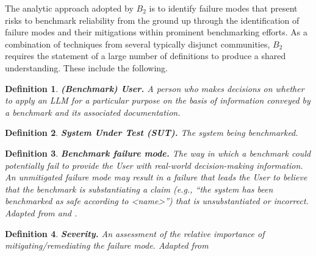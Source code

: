 \documentclass{article}
\newtheorem{dfn}{Definition}[section]
\newcommand\bb{$B_2$ }
\begin{document}
The analytic approach adopted by \bb is to identify failure modes that present risks to benchmark reliability from the ground up through the identification of failure modes and their mitigations within prominent benchmarking efforts. As a combination of techniques from several typically disjunct communities, \bb requires the statement of a large number of definitions to produce a shared understanding. These include the following.

\begin{dfn}
{\bf (Benchmark) User.} A person who makes decisions on whether to apply an LLM for a particular purpose on the basis of information conveyed by a benchmark and its associated documentation.
\end{dfn}
\begin{dfn}
{\bf System Under Test (SUT).} The system being benchmarked.
\end{dfn}
\begin{dfn}
{\bf Benchmark failure mode.} The way in which a benchmark could potentially fail to provide the User with real-world decision-making information.  An unmitigated failure mode may result in a failure that leads the User to believe that the benchmark is substantiating a claim (e.g., ``the system has been benchmarked as safe according to <name>'') that is unsubstantiated or incorrect. Adapted from \cite{cnssi4009} and \cite{Rausand2004}.
\end{dfn}
\begin{dfn}
{\bf Severity.} An assessment of the relative importance of mitigating/remediating the failure mode.  Adapted from \cite{nist80030r1}
\end{dfn}
\end{document}
